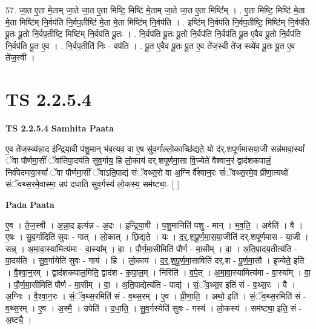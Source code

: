 \documentclass[17pt]{extarticle}
\begin{document}
57. जा॒त ए॒ता मे॒ताम् जा॒ते जा॒त ए॒ता मिष्टि॒ मिष्टि॑ मे॒ताम् जा॒ते जा॒त ए॒ता मिष्टि᳚म् । . ए॒ता मिष्टि॒ मिष्टि॑ मे॒ता मे॒ता मिष्टि॑म् नि॒र्वप॑ति नि॒र्वप॒तीष्टि॑ मे॒ता मे॒ता मिष्टि॑म् नि॒र्वप॑ति । . इष्टि॑म् नि॒र्वप॑ति नि॒र्वप॒तीष्टि॒ मिष्टि॑म् नि॒र्वप॑ति पू॒तः पू॒तो नि॒र्वप॒तीष्टि॒ मिष्टि॑म् नि॒र्वप॑ति पू॒तः । . नि॒र्वप॑ति पू॒तः पू॒तो नि॒र्वप॑ति नि॒र्वप॑ति पू॒त ए॒वैव पू॒तो नि॒र्वप॑ति नि॒र्वप॑ति पू॒त ए॒व । . नि॒र्वप॒तीति॑ निः - वप॑ति । . पू॒त ए॒वैव पू॒तः पू॒त ए॒व ते॑ज॒स्वी ते॑ज॒ स्व्ये॑व पू॒तः पू॒त ए॒व ते॑ज॒स्वी । \newline
\pagebreak
{}

\section{ TS 2.2.5.4 }

\textbf{TS 2.2.5.4 } \newline
\textbf{Samhita Paata} \newline

ए॒व ते॑ज॒स्व्य॑न्ना॒द इ॑न्द्रिया॒वी प॑शु॒मान् भ॑व॒त्यव॒ वा ए॒ष सु॑व॒र्गाल्लो॒काच्छि॑द्यते॒ यो द॑र्.शपूर्णमासया॒जी सन्न॑मावा॒स्यां᳚ ॅवा पौर्णमा॒सीं ॅवा॑तिपा॒दय॑ति सुव॒र्गाय॒ हि लो॒काय॑ दर्.शपूर्णमा॒सा वि॒ज्येते॑ वैश्वान॒रं द्वाद॑शकपालं॒ निर्व॑पेदमावा॒स्यां᳚ ॅवा पौर्णमा॒सीं ॅवा॑ऽति॒पाद्य॑ संॅवथ्स॒रो वा अ॒ग्नि र्वै᳚श्वान॒रः सं॑ॅवथ्स॒रमे॒व प्री॑णा॒त्यथो॑ संॅवथ्स॒रमे॒वास्मा॒ उप॑ दधाति सुव॒र्गस्य॑ लो॒कस्य॒ सम॑ष्ट्या॒-  [  ] \newline

\textbf{Pada Paata} \newline

ए॒व । ते॒ज॒स्वी । अ॒न्ना॒द इत्य॑न्न - अ॒दः । इ॒न्द्रि॒या॒वी । प॒शु॒मानिति॑ पशु - मान् । भ॒व॒ति॒ । अवेति॑ । वै । ए॒षः । सु॒व॒र्गादिति॑ सुवः - गात् । लो॒कात् । छि॒द्य॒ते॒ । यः । द॒र्॒.श॒पू॒र्ण॒मा॒स॒या॒जीति॑ दर्.शपूर्णमास - या॒जी । सन्न् । अ॒मा॒वा॒स्या॑मित्य॑मा - वा॒स्या᳚म् । वा॒ । पौ॒र्ण॒मा॒सीमिति॑ पौर्ण - मा॒सीम् । वा॒ । अ॒ति॒पा॒दय॒तीत्य॑ति - पा॒दय॑ति । सु॒व॒र्गायेति॑ सुवः - गाय॑ । हि । लो॒काय॑ । द॒र्॒.श॒पू॒र्ण॒मा॒साविति॑ दर्.श - पू॒र्ण॒मा॒सौ । इ॒ज्येते॒ इति॑ । वै॒श्वा॒न॒रम् । द्वाद॑शकपाल॒मिति॒ द्वाद॑श - क॒पा॒ल॒म् । निरिति॑ । व॒पे॒त् । अ॒मा॒वा॒स्या॑मित्य॑मा - वा॒स्या᳚म् । वा॒ । पौ॒र्ण॒मा॒सीमिति॑ पौर्ण - मा॒सीम् । वा॒ । अ॒ति॒पाद्येत्य॑ति - पाद्य॑ । सं॒ॅव॒थ्स॒र इति॑ सं - व॒थ्स॒रः । वै । अ॒ग्निः । वै॒श्वा॒न॒रः । सं॒ॅव॒थ्स॒रमिति॑ सं - व॒थ्स॒रम् । ए॒व । प्री॒णा॒ति॒ । अथो॒ इति॑ । सं॒ॅव॒थ्स॒रमिति॑ सं - व॒थ्स॒रम् । ए॒व । अ॒स्मै॒ । उपेति॑ । द॒धा॒ति॒ । सु॒व॒र्गस्येति॑ सुवः - गस्य॑ । लो॒कस्य॑ । सम॑ष्ट्या॒ इति॒ सं - अ॒ष्ट्यै॒ ।  \newline
\end{document}

